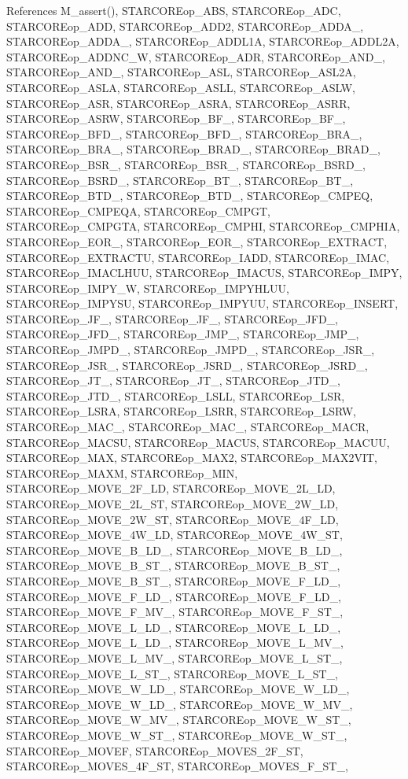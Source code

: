 References M\_\-assert(), STARCOREop\_\-ABS, STARCOREop\_\-ADC, STARCOREop\_\-ADD, STARCOREop\_\-ADD2, STARCOREop\_\-ADDA\_, STARCOREop\_\-ADDA\_, STARCOREop\_\-ADDL1A, STARCOREop\_\-ADDL2A, STARCOREop\_\-ADDNC\_\-W, STARCOREop\_\-ADR, STARCOREop\_\-AND\_, STARCOREop\_\-AND\_, STARCOREop\_\-ASL, STARCOREop\_\-ASL2A, STARCOREop\_\-ASLA, STARCOREop\_\-ASLL, STARCOREop\_\-ASLW, STARCOREop\_\-ASR, STARCOREop\_\-ASRA, STARCOREop\_\-ASRR, STARCOREop\_\-ASRW, STARCOREop\_\-BF\_, STARCOREop\_\-BF\_, STARCOREop\_\-BFD\_, STARCOREop\_\-BFD\_, STARCOREop\_\-BRA\_, STARCOREop\_\-BRA\_, STARCOREop\_\-BRAD\_, STARCOREop\_\-BRAD\_, STARCOREop\_\-BSR\_, STARCOREop\_\-BSR\_, STARCOREop\_\-BSRD\_, STARCOREop\_\-BSRD\_, STARCOREop\_\-BT\_, STARCOREop\_\-BT\_, STARCOREop\_\-BTD\_, STARCOREop\_\-BTD\_, STARCOREop\_\-CMPEQ, STARCOREop\_\-CMPEQA, STARCOREop\_\-CMPGT, STARCOREop\_\-CMPGTA, STARCOREop\_\-CMPHI, STARCOREop\_\-CMPHIA, STARCOREop\_\-EOR\_, STARCOREop\_\-EOR\_, STARCOREop\_\-EXTRACT, STARCOREop\_\-EXTRACTU, STARCOREop\_\-IADD, STARCOREop\_\-IMAC, STARCOREop\_\-IMACLHUU, STARCOREop\_\-IMACUS, STARCOREop\_\-IMPY, STARCOREop\_\-IMPY\_\-W, STARCOREop\_\-IMPYHLUU, STARCOREop\_\-IMPYSU, STARCOREop\_\-IMPYUU, STARCOREop\_\-INSERT, STARCOREop\_\-JF\_, STARCOREop\_\-JF\_, STARCOREop\_\-JFD\_, STARCOREop\_\-JFD\_, STARCOREop\_\-JMP\_, STARCOREop\_\-JMP\_, STARCOREop\_\-JMPD\_, STARCOREop\_\-JMPD\_, STARCOREop\_\-JSR\_, STARCOREop\_\-JSR\_, STARCOREop\_\-JSRD\_, STARCOREop\_\-JSRD\_, STARCOREop\_\-JT\_, STARCOREop\_\-JT\_, STARCOREop\_\-JTD\_, STARCOREop\_\-JTD\_, STARCOREop\_\-LSLL, STARCOREop\_\-LSR, STARCOREop\_\-LSRA, STARCOREop\_\-LSRR, STARCOREop\_\-LSRW, STARCOREop\_\-MAC\_, STARCOREop\_\-MAC\_, STARCOREop\_\-MACR, STARCOREop\_\-MACSU, STARCOREop\_\-MACUS, STARCOREop\_\-MACUU, STARCOREop\_\-MAX, STARCOREop\_\-MAX2, STARCOREop\_\-MAX2VIT, STARCOREop\_\-MAXM, STARCOREop\_\-MIN, STARCOREop\_\-MOVE\_\-2F\_\-LD, STARCOREop\_\-MOVE\_\-2L\_\-LD, STARCOREop\_\-MOVE\_\-2L\_\-ST, STARCOREop\_\-MOVE\_\-2W\_\-LD, STARCOREop\_\-MOVE\_\-2W\_\-ST, STARCOREop\_\-MOVE\_\-4F\_\-LD, STARCOREop\_\-MOVE\_\-4W\_\-LD, STARCOREop\_\-MOVE\_\-4W\_\-ST, STARCOREop\_\-MOVE\_\-B\_\-LD\_, STARCOREop\_\-MOVE\_\-B\_\-LD\_, STARCOREop\_\-MOVE\_\-B\_\-ST\_, STARCOREop\_\-MOVE\_\-B\_\-ST\_, STARCOREop\_\-MOVE\_\-B\_\-ST\_, STARCOREop\_\-MOVE\_\-F\_\-LD\_, STARCOREop\_\-MOVE\_\-F\_\-LD\_, STARCOREop\_\-MOVE\_\-F\_\-LD\_, STARCOREop\_\-MOVE\_\-F\_\-MV\_, STARCOREop\_\-MOVE\_\-F\_\-ST\_, STARCOREop\_\-MOVE\_\-L\_\-LD\_, STARCOREop\_\-MOVE\_\-L\_\-LD\_, STARCOREop\_\-MOVE\_\-L\_\-LD\_, STARCOREop\_\-MOVE\_\-L\_\-MV\_, STARCOREop\_\-MOVE\_\-L\_\-MV\_, STARCOREop\_\-MOVE\_\-L\_\-ST\_, STARCOREop\_\-MOVE\_\-L\_\-ST\_, STARCOREop\_\-MOVE\_\-L\_\-ST\_, STARCOREop\_\-MOVE\_\-W\_\-LD\_, STARCOREop\_\-MOVE\_\-W\_\-LD\_, STARCOREop\_\-MOVE\_\-W\_\-LD\_, STARCOREop\_\-MOVE\_\-W\_\-MV\_, STARCOREop\_\-MOVE\_\-W\_\-MV\_, STARCOREop\_\-MOVE\_\-W\_\-ST\_, STARCOREop\_\-MOVE\_\-W\_\-ST\_, STARCOREop\_\-MOVE\_\-W\_\-ST\_, STARCOREop\_\-MOVEF, STARCOREop\_\-MOVES\_\-2F\_\-ST, STARCOREop\_\-MOVES\_\-4F\_\-ST, STARCOREop\_\-MOVES\_\-F\_\-ST\_, 